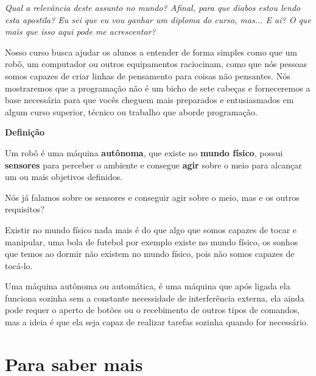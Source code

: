 \textit{Qual a relevância deste assunto no mundo? Afinal, para que diabos estou lendo esta apostila? Eu sei que eu vou ganhar um diploma do curso, mas... E aí? O que mais que isso aqui pode me acrescentar?}

Nosso curso busca ajudar os alunos a entender de forma simples como que um robô, um computador ou outros equipamentos raciocinam, como que nós pessoas somos capazes de criar linhas de pensamento para coisas não pensantes. Nós mostraremos que a programação não é um bicho de sete cabeças e forneceremos a base necessária para que vocês cheguem mais preparados e entusiasmados em algum curso superior, técnico ou trabalho que aborde programação.


\vfill
\begin{center}

    \textbf{Definição}
    
    \justify
    Um robô é uma máquina \textbf{autônoma}, que existe no \textbf{mundo físico}, possui \textbf{sensores} para perceber o ambiente e consegue \textbf{agir} sobre o meio para alcançar um ou mais objetivos definidos.
\end{center}

Nós já falamos sobre os sensores e conseguir agir sobre o meio, mas e os outros requisitos?

Existir no mundo físico nada mais é do que algo que somos capazes de tocar e manipular, uma bola de futebol por exemplo existe no mundo físico, os sonhos que temos ao dormir não existem no mundo físico, pois não somos capazes de tocá-lo.

Uma máquina autônoma ou automática, é uma máquina que após ligada ela funciona sozinha sem a constante necessidade de interferência externa, ela ainda pode requer o aperto de botões ou o recebimento de outros tipos de comandos, mas a ideia é que ela seja capaz de realizar tarefas sozinha quando for necessário.

\section*{Para saber mais}

